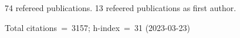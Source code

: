 74 refereed publications. 13 refeered publications as first author.

Total citations~=~3157; h-index~=~31 (2023-03-23)